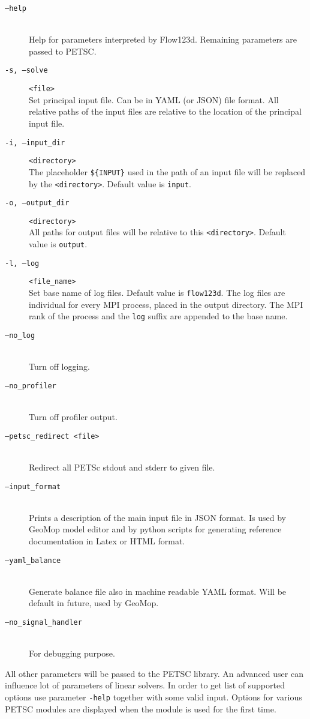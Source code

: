 \documentclass[12pt,a4paper]{report}
\begin{document}
\begin{description}
 \item[{\tt --help}] \hfill\\
        Help for parameters interpreted by Flow123d. Remaining parameters are passed to PETSC.
 \item[ {\tt -s, --solve} ] \verb'<file>' \hfill\\
 	 Set principal input file. Can be in YAML (or  JSON) file format. All relative paths of the input 
 	 files are relative to the location of the principal input file.
 \item[{\tt -i, --input\_dir}] \verb'<directory>' \hfill\\
 	The placeholder \verb"${INPUT}" %
  	used in the path of an input file will be replaced by the \verb'<directory>'. Default value is \verb'input'.
 \item[{\tt -o, --output\_dir}] \verb'<directory>' \hfill\\
 	All paths for output files will be relative to this \verb'<directory>'. Default value is \verb'output'.
 \item[{\tt -l, --log}] \verb'<file_name>' \hfill\\
 	Set base name of log files. Default value is \verb'flow123d'. The log files are individual for every MPI process, placed in the output directory. 
 	The MPI rank of the process and the \verb'log' suffix are appended to the base name.
 \item[{\tt --no\_log}] \hfill\\
        Turn off logging.
 \item[{\tt --no\_profiler}] \hfill\\
        Turn off profiler output.
 \item[{\tt --petsc\_redirect <file>}] \hfill\\
        Redirect all PETSc stdout and stderr to given file.       
 \item[{\tt --input\_format}] \hfill\\ 
        Prints a description of the main input file in JSON format. Is used by GeoMop model editor and by python scripts for 
        generating reference documentation in Latex or HTML format.
 \item[{\tt --yaml\_balance}] \hfill\\
        Generate balance file also in machine readable YAML format. Will be default in future, used by GeoMop.
 \item[{\tt --no\_signal\_handler}] \hfill\\
        For debugging purpose.
        
\end{description}
All other parameters will be passed to the PETSC library. An advanced user can influence lot of parameters of linear solvers. In order to get list of supported options 
use parameter \verb'-help' together with some valid input. Options for various PETSC modules are displayed when the module is used for the first time.
\end{document}
